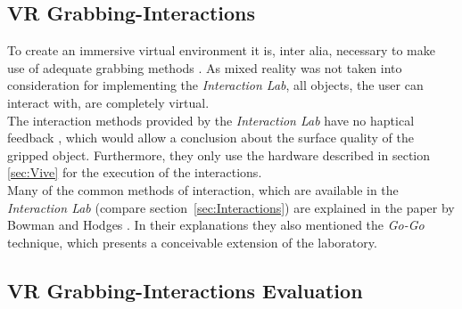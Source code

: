 \subsection{VR Grabbing-Interactions}\label{sec:SOTAInteractions}
To create an immersive virtual environment it is, inter alia, necessary to make use of adequate grabbing methods \cite{Bowman}. As mixed reality was not taken into consideration for implementing the \textit{Interaction Lab}, all objects, the user can interact with, are completely virtual. \\
The interaction methods provided by the \textit{Interaction Lab} have no haptical feedback \cite{768179}, which would allow a conclusion about the surface quality of the gripped object. Furthermore, they only use the hardware described in section \ref{sec:Vive} for the execution of the interactions. \\
Many of the common methods of interaction, which are available in the \textit{Interaction Lab} (compare section~\ref {sec:Interactions}) are explained in the paper by Bowman and Hodges \cite{Bowman}. In their explanations they also mentioned the  \textit{Go-Go} technique, which presents a conceivable extension of the laboratory.

\subsection{VR Grabbing-Interactions Evaluation}\label{sec:SOTAInteractionEvalutiom}

\newpage
